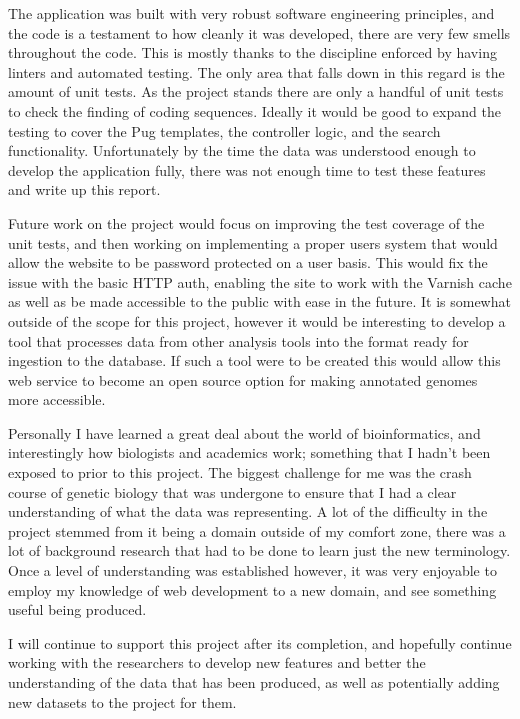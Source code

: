The application was built with very robust software engineering principles, and the code is a testament to how cleanly it was developed, there are very few smells\cite{smells} throughout the code. This is mostly thanks to the discipline enforced by having linters and automated testing. The only area that falls down in this regard is the amount of unit tests. As the project stands there are only a handful of unit tests to check the finding of coding sequences. Ideally it would be good to expand the testing to cover the Pug templates, the controller logic, and the search functionality. Unfortunately by the time the data was understood enough to develop the application fully, there was not enough time to test these features and write up this report. 

Future work on the project would focus on improving the test coverage of the unit tests, and then working on implementing a proper users system that would allow the website to be password protected on a user basis. This would fix the issue with the basic HTTP auth, enabling the site to work with the Varnish cache as well as be made accessible to the public with ease in the future. It is somewhat outside of the scope for this project, however it would be interesting to develop a tool that processes data from other analysis tools into the format ready for ingestion to the database. If such a tool were to be created this would allow this web service to become an open source option for making annotated genomes more accessible. 

Personally I have learned a great deal about the world of bioinformatics, and interestingly how biologists and academics work; something that I hadn't been exposed to prior to this project. The biggest challenge for me was the crash course of genetic biology that was undergone to ensure that I had a clear understanding of what the data was representing. A lot of the difficulty in the project stemmed from it being a domain outside of my comfort zone, there was a lot of background research that had to be done to learn just the new terminology. Once a level of understanding was established however, it was very enjoyable to employ my knowledge of web development to a new domain, and see something useful being produced.

I will continue to support this project after its completion, and hopefully continue working with the researchers to develop new features and better the understanding of the data that has been produced, as well as potentially adding new datasets to the project for them. 


